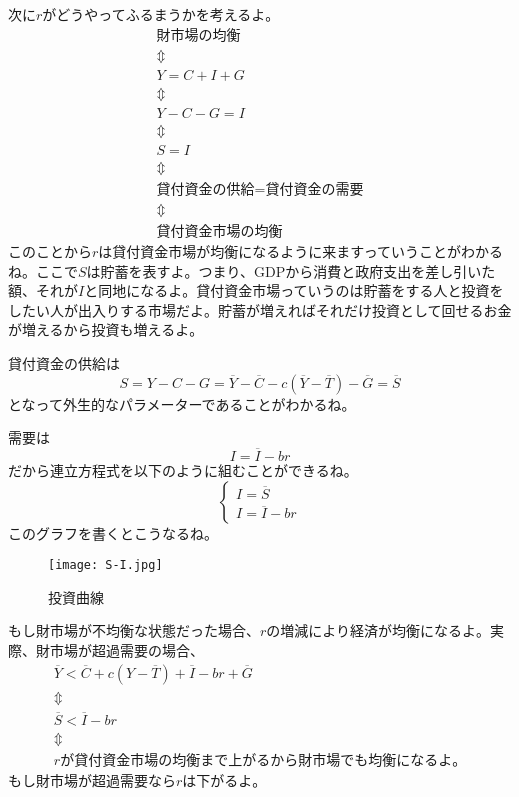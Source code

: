 \documentclass[a4paper, 12pt]{article}
\begin{document}
次に$r$がどうやってふるまうかを考えるよ。
\begin{displaymath}
  \begin{array}{c}
    \text{財市場の均衡}\\
    \Updownarrow \\
    Y=C+I+G \\
    \Updownarrow \\
    Y-C-G=I\\
    \Updownarrow \\
    S=I\\
    \Updownarrow \\
    \text{貸付資金の供給} = \text{貸付資金の需要}\\
    \Updownarrow \\
    \text{貸付資金市場の均衡}
  \end{array}
\end{displaymath}
このことから$r$は貸付資金市場が均衡になるように来ますっていうことがわかるね。ここで$S$は貯蓄を表すよ。つまり、GDPから消費と政府支出を差し引いた額、それが$I$と同地になるよ。貸付資金市場っていうのは貯蓄をする人と投資をしたい人が出入りする市場だよ。貯蓄が増えればそれだけ投資として回せるお金が増えるから投資も増えるよ。

貸付資金の供給は
\begin{equation*}
  S=Y-C-G=\overline{Y}-\overline{C}-c(\overline{Y}-\overline{T})-\overline{G} =\overline{S}
\end{equation*}
となって外生的なパラメーターであることがわかるね。

需要は
\begin{equation*}
  I=\overline{I}-br
\end{equation*}
だから連立方程式を以下のように組むことができるね。
\begin{displaymath}
  \left\{\begin{array}{l}
    I=\overline{S}\\
    I=\overline{I}-br
  \end{array}\right.
\end{displaymath}
このグラフを書くとこうなるね。
\begin{figure}[h]
\begin{center}
\texttt{[image: S-I.jpg]}
\caption{投資曲線}
\label{}
\end{center}
\end{figure}
もし財市場が不均衡な状態だった場合、$r$の増減により経済が均衡になるよ。実際、財市場が超過需要の場合、
\begin{displaymath}
  \begin{array}{c}
    \overline{Y}<\overline{C}+c(Y-\overline{T})+\overline{I}-br+\overline{G}\\
    \Updownarrow \\
    \overline{S}<\overline{I}-br \\
    \Updownarrow \\
    r \text{が貸付資金市場の均衡まで上がるから財市場でも均衡になるよ。}
  \end{array}
\end{displaymath}
もし財市場が超過需要なら$r$は下がるよ。
\end{document}
